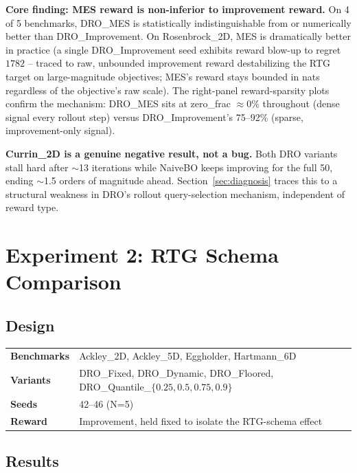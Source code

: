 \documentclass[11pt]{article}
\begin{document}
\textbf{Core finding: MES reward is non-inferior to improvement reward.} On
4 of 5 benchmarks, DRO\_MES is statistically indistinguishable from or
numerically better than DRO\_Improvement. On Rosenbrock\_2D, MES is dramatically
better in practice (a single DRO\_Improvement seed exhibits reward blow-up to
regret $1782$ -- traced to raw, unbounded improvement reward destabilizing the
RTG target on large-magnitude objectives; MES's reward stays bounded in nats
regardless of the objective's raw scale). The right-panel reward-sparsity plots
confirm the mechanism: DRO\_MES sits at zero\_frac $\approx 0\%$ throughout
(dense signal every rollout step) versus DRO\_Improvement's 75--92\% (sparse,
improvement-only signal).

\textbf{Currin\_2D is a genuine negative result, not a bug.} Both DRO variants
stall hard after $\sim$13 iterations while NaiveBO keeps improving for the full
50, ending $\sim$1.5 orders of magnitude ahead. Section~\ref{sec:diagnosis}
traces this to a structural weakness in DRO's rollout query-selection mechanism,
independent of reward type.

\FloatBarrier
\section{Experiment 2: RTG Schema Comparison}

\subsection{Design}

\begin{center}
\begin{tabular}{ll}
\toprule
\textbf{Benchmarks} & Ackley\_2D, Ackley\_5D, Eggholder, Hartmann\_6D \\
\textbf{Variants} & DRO\_Fixed, DRO\_Dynamic, DRO\_Floored, DRO\_Quantile\_$\{0.25,0.5,0.75,0.9\}$ \\
\textbf{Seeds} & 42--46 (N=5) \\
\textbf{Reward} & Improvement, held fixed to isolate the RTG-schema effect \\
\bottomrule
\end{tabular}
\end{center}

\subsection{Results}
\end{document}
